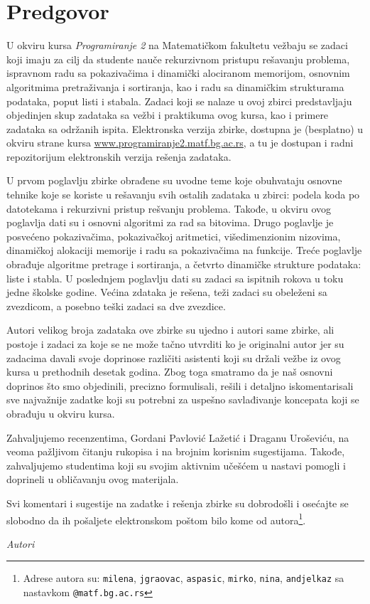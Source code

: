 
\chapter*{Predgovor}

U okviru kursa {\em Programiranje 2} na Matematičkom fakultetu vežbaju se zadaci 
koji imaju za cilj da studente nauče rekurzivnom pristupu rešavanju problema, 
ispravnom radu sa pokazivačima i dinamički alociranom memorijom, osnovnim algoritmima 
pretraživanja i sortiranja, kao i radu sa dinamičkim strukturama podataka, 
poput listi i stabala. Zadaci koji se nalaze u ovoj zbirci predstavljaju 
objedinjen skup zadataka sa vežbi i praktikuma ovog kursa, kao i primere 
zadataka sa održanih ispita. Elektronska verzija zbirke, dostupna je 
(besplatno) u okviru strane kursa \url{www.programiranje2.matf.bg.ac.rs}, 
a tu je dostupan i radni repozitorijum elektronskih verzija rešenja zadataka.

U prvom poglavlju zbirke obrađene su uvodne teme koje obuhvataju osnovne tehnike koje se koriste u rešavanju svih ostalih zadataka u zbirci: podela koda po datotekama i rekurzivni pristup rešvanju problema. Takođe, u okviru ovog poglavlja dati su i osnovni algoritmi za rad sa bitovima. Drugo poglavlje je posvećeno pokazivačima, pokazivačkoj aritmetici, višedimenzionim nizovima, dinamičkoj alokaciji memorije i radu sa pokazivačima na funkcije. Treće poglavlje obrađuje algoritme pretrage i sortiranja, a četvrto dinamičke strukture podataka: liste i stabla. U poslednjem poglavlju dati su zadaci sa ispitnih rokova u toku jedne školske godine. Većina zdataka je rešena, teži zadaci su obeleženi sa zvezdicom, a posebno teški zadaci sa dve zvezdice.


Autori velikog broja zadataka ove zbirke su ujedno i autori same zbirke, ali postoje 
i zadaci za koje se ne može tačno utvrditi ko je originalni autor jer su zadacima 
davali svoje doprinose različiti asistenti koji su držali vežbe iz ovog kursa u 
prethodnih desetak godina. Zbog toga smatramo da je naš osnovni doprinos 
što smo objedinili, precizno formulisali, rešili i detaljno iskomentarisali 
sve najvažnije zadatke koji su potrebni za uspešno savlađivanje koncepata 
koji se obrađuju u okviru kursa. 

\newpage
Zahvaljujemo recenzentima, Gordani Pavlović Lažetić i Draganu Uroševiću, na veoma pažljivom čitanju rukopisa i na brojnim korisnim sugestijama. Takođe, zahvaljujemo studentima koji su svojim aktivnim učešćem u nastavi pomogli i doprineli u obličavanju ovog materijala. 

Svi komentari i sugestije na zadatke i rešenja zbirke su dobrodošli i osećajte se slobodno da ih pošaljete elektronskom poštom bilo kome od autora\footnote{Adrese autora su: \texttt{milena}, \texttt{jgraovac}, \texttt{aspasic}, \texttt{mirko}, \texttt{nina}, \texttt{andjelkaz} sa nastavkom \texttt{@matf.bg.ac.rs}}. 





\bigskip

\begin{flushright}
{\em Autori}
\end{flushright}
